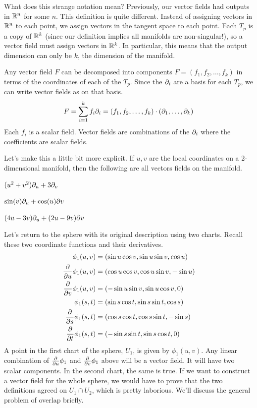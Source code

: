 \documentclass[fleqn,letterpaper]{report}
\begin{document}
What does this strange notation mean? Previously, our vector
fields had outputs in $\mathbb{R}^n$ for some $n$. This definition is
quite different. Instead of assigning vectors in $\mathbb{R}^n$ to
each point, we assign vectors in the tangent space to each
point. Each $T_p$ is a copy of $\mathbb{R}^k$ (since our definition
implies all manifolds are non-singular!), so a vector field
must assign vectors in $\mathbb{R}^k$. In particular, this means
that the output dimension can only be $k$, the dimension of
the manifold. 

Any vector field $F$ can be decomposed into components $F =
(f_1, f_2, \ldots, f_k)$ in terms of the coordinates of each
of the $T_p$. Since the $\partial_i$ are a basis for each $T_p$,
we can write vector fields as on that basis. 
\begin{equation*}
F = \sum_{i=1}^k f_i \partial_i = (f_1, f_2, \ldots, f_k) \cdot
(\partial_1, \ldots, \partial_k)
\end{equation*}
Each $f_i$ is a scalar field. Vector fields are
combinations of the $\partial_i$ where the coefficients are
scalar fields. 

\begin{example}
Let's make this a little bit more explicit. If $u,v$ are the
local coordinates on a 2-dimensional manifold, then the
following are all vectors fields on the manifold.
\begin{smallitemize}
\item $(u^2 + v^2) \partial_u + 3 \partial_v$ 
\item $\sin (v) \partial_u + \cos(u) \partial v$
\item $(4u-3v) \partial_u + (2u-9v)\partial v$
\end{smallitemize}
\end{example}

\begin{example}
Let's return to the sphere with its original description using
two charts. Recall these two coordinate functions and their
derivatives.
\begin{align*}
\phi_1 (u,v) & = (\sin u \cos v, \sin u \sin v, \cos u) \\
\frac{\partial}{\partial u} \phi_1 (u,v) & = (\cos u \cos v, \cos u
\sin v, -\sin u) \\
\frac{\partial}{\partial v} \phi_1 (u,v) & = (-\sin u \sin v, \sin u
\cos v, 0) \\
\phi_1 (s,t) & = (\sin s \cos t, \sin s \sin t, \cos s) \\
\frac{\partial}{\partial s} \phi_1 (s,t) & = (\cos s \cos t, \cos s
\sin t, -\sin s) \\
\frac{\partial}{\partial t} \phi_1 (s,t) & = (-\sin s \sin t, \sin s
\cos t, 0) 
\end{align*}
A point in the first chart of the sphere, $U_1$, is given by
$\phi_1(u,v)$. Any linear combination of $\frac{\partial}{\partial u}
\phi_1$ and $\frac{\partial}{\partial v} \phi_1$ above will be a
vector field. It will have two scalar components. In the
second chart, the same is true. If we want to construct a vector
field for the whole sphere, we would have to prove that the
two definitions agreed on $U_1 \cap U_2$, which is pretty
laborious. We'll discuss the general problem of overlap
briefly.
\end{example}
\end{document}
